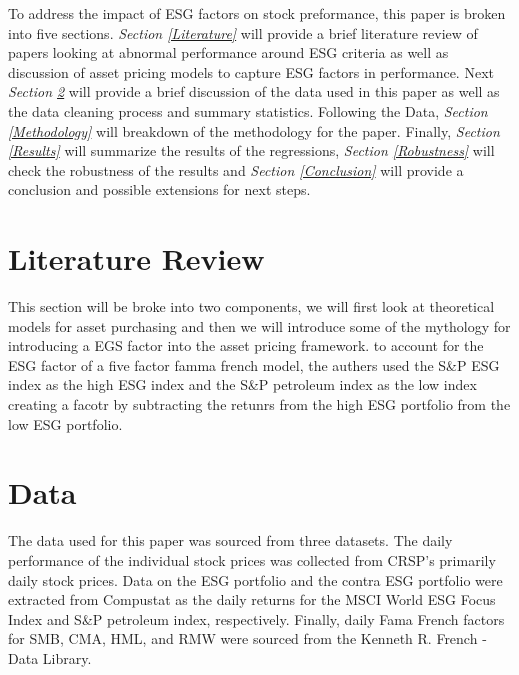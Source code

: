 \documentclass[12pt,oneside,reqno]{amsart}
\begin{document}
To address the impact of ESG factors on stock preformance, this paper is broken into five sections. \textit{Section \ref{Literature}} will provide a  brief literature review of papers looking at abnormal performance around ESG criteria as well as discussion of asset pricing models to capture ESG factors in performance. Next \textit{ Section \ref{Data}}  will provide a brief discussion of the data used in this paper as well as the data cleaning process and summary statistics. Following the Data, \textit{Section \ref{Methodology}} will breakdown of the methodology for the paper. Finally, \textit{Section \ref{Results}}  will summarize the results of the regressions, \textit{Section \ref{Robustness}} will check the robustness of the results and \textit{Section \ref{Conclusion}} will provide a conclusion and possible extensions for next steps. 

\section{Literature Review}
This section will be broke into two components, we will first look at theoretical models for asset purchasing and then we will introduce some of the mythology for introducing a EGS factor into the asset pricing framework.
to account for the ESG factor of a five factor famma french model, the authers used the S\&P ESG index as the high ESG index and the S\&P petroleum index as the low index creating a facotr by subtracting the retunrs from the high ESG portfolio from the low ESG portfolio. \cite{Gregory2020TheGP}
\label{Literature}

\section{Data}
\label{Data}
The data used for this paper was sourced from three datasets. The daily performance of the individual stock prices was collected from CRSP's primarily daily stock prices. Data on the ESG portfolio and the contra ESG portfolio were extracted from Compustat as the daily returns for the MSCI World ESG Focus Index and S\&P petroleum index, respectively. Finally, daily Fama French factors for SMB, CMA, HML, and RMW were sourced from the Kenneth R. French - Data Library.  
\end{document}
